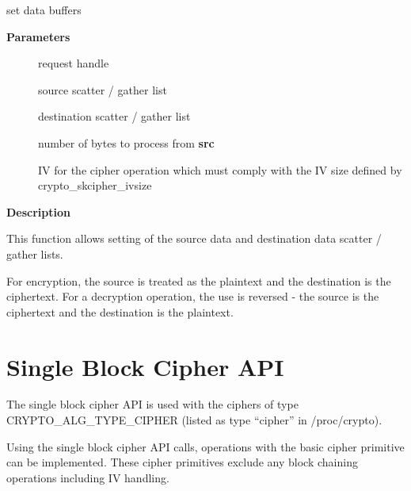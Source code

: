 \documentclass[a4paper,8pt,english]{sphinxmanual}
\begin{document}
\begin{fulllineitems}
\label{crypto/api-skcipher:c.skcipher_request_set_crypt}
set data buffers

\end{fulllineitems}


\textbf{Parameters}
\begin{description}
\item[{}] \leavevmode
request handle

\item[{}] \leavevmode
source scatter / gather list

\item[{}] \leavevmode
destination scatter / gather list

\item[{}] \leavevmode
number of bytes to process from \textbf{src}

\item[{}] \leavevmode
IV for the cipher operation which must comply with the IV size defined
by crypto\_skcipher\_ivsize

\end{description}

\textbf{Description}

This function allows setting of the source data and destination data
scatter / gather lists.

For encryption, the source is treated as the plaintext and the
destination is the ciphertext. For a decryption operation, the use is
reversed - the source is the ciphertext and the destination is the plaintext.


\section{Single Block Cipher API}
\label{crypto/api-skcipher:single-block-cipher-api}
The single block cipher API is used with the ciphers of type
CRYPTO\_ALG\_TYPE\_CIPHER (listed as type ``cipher'' in /proc/crypto).

Using the single block cipher API calls, operations with the basic cipher
primitive can be implemented. These cipher primitives exclude any block
chaining operations including IV handling.
\end{document}
